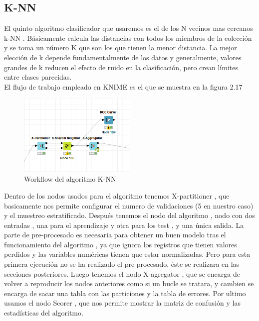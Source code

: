 
	\subsection{K-NN}

	El quinto algoritmo clasificador que usaremos es el de los N vecinos mas cercanos k-NN  \cite{Wikipedia5} . Básicamente calcula las distancias 
	con todos los miembros de la colección y se toma un número K que son los que tienen la menor distancia. La mejor elección de k 
	depende fundamentalmente de los datos y generalmente, valores grandes de k reducen el efecto de ruido en la clasificación, pero crean límites entre clases parecidas. \\

	El flujo de trabajo empleado en KNIME es el que se muestra en la figura 2.17

	\begin{figure}[htb]
		\centering
		\includegraphics[width=0.5\textwidth]{./imagenes/22}
		\caption{Workflow del algoritmo K-NN} \label{fig:1}
	\end{figure}

	Dentro de los nodos usados para el algoritmo tenemos X-partitioner , que basicamente nos permite configurar el numero de validaciones
	(5 en nuestro caso) y el muestreo estratificado. Después tenemos el nodo del algoritmo , nodo con dos entradas , una para el aprendizaje y otra para los test , y una única salida.
	La parte de pre-procesado es necesaria para obtener un buen modelo tras el funcionamiento del algoritmo , ya que ignora los registros que tienen valores perdidos y las variables numéricas
	tienen que estar normalizadas. Pero para esta primera ejecución no se ha realizado el pre-procesado, éste se realizara en las secciones posteriores. Luego tenemos el nodo X-agregator  , que se encarga de volver a reproducir los nodos anteriores como si un bucle se tratara,
	y cambien se encarga de sacar una tabla con las particiones y la tabla de errores. Por ultimo usamos el nodo Scorer , que nos permite mostrar la matriz de confusión y las estadísticas del algoritmo. \\

